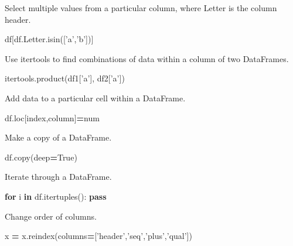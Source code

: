 \documentclass[]{book}
\newenvironment{Shaded}{\begin{snugshade}}{\end{snugshade}}
\newcommand{\KeywordTok}[1]{\textcolor[rgb]{0.13,0.29,0.53}{\textbf{#1}}}
\newcommand{\StringTok}[1]{\textcolor[rgb]{0.31,0.60,0.02}{#1}}
\newcommand{\VariableTok}[1]{\textcolor[rgb]{0.00,0.00,0.00}{#1}}
\newcommand{\ControlFlowTok}[1]{\textcolor[rgb]{0.13,0.29,0.53}{\textbf{#1}}}
\newcommand{\OperatorTok}[1]{\textcolor[rgb]{0.81,0.36,0.00}{\textbf{#1}}}
\newcommand{\NormalTok}[1]{#1}
\begin{document}
Select multiple values from a particular column, where Letter is the
column header.

\begin{Shaded}
\begin{Highlighting}[]
\NormalTok{df[df.Letter.isin([}\StringTok{'a'}\NormalTok{,}\StringTok{'b'}\NormalTok{])]}
\end{Highlighting}
\end{Shaded}

Use itertools to find combinations of data within a column of two
DataFrames.

\begin{Shaded}
\begin{Highlighting}[]
\NormalTok{itertools.product(df1[}\StringTok{'a'}\NormalTok{], df2[}\StringTok{'a'}\NormalTok{])}
\end{Highlighting}
\end{Shaded}

Add data to a particular cell within a DataFrame.

\begin{Shaded}
\begin{Highlighting}[]
\NormalTok{df.loc[index,column]}\OperatorTok{=}\NormalTok{num}
\end{Highlighting}
\end{Shaded}

Make a copy of a DataFrame.

\begin{Shaded}
\begin{Highlighting}[]
\NormalTok{df.copy(deep}\OperatorTok{=}\VariableTok{True}\NormalTok{)}
\end{Highlighting}
\end{Shaded}

Iterate through a DataFrame.

\begin{Shaded}
\begin{Highlighting}[]
\ControlFlowTok{for}\NormalTok{ i }\KeywordTok{in}\NormalTok{ df.itertuples():}
    \ControlFlowTok{pass}
\end{Highlighting}
\end{Shaded}

Change order of columns.

\begin{Shaded}
\begin{Highlighting}[]
\NormalTok{x }\OperatorTok{=}\NormalTok{ x.reindex(columns}\OperatorTok{=}\NormalTok{[}\StringTok{'header'}\NormalTok{,}\StringTok{'seq'}\NormalTok{,}\StringTok{'plus'}\NormalTok{,}\StringTok{'qual'}\NormalTok{])}
\end{Highlighting}
\end{Shaded}
\end{document}
